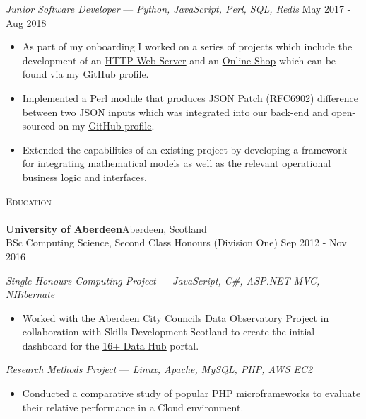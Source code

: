 \documentclass[a4paper]{article}
\newcommand{\lineunder} {
    \vspace*{-8pt} \\
    \hspace*{-18pt} \hrulefill \\
}
\newcommand{\header} [1] {
    {\hspace*{-18pt}\vspace*{6pt} \textsc{#1}}
    \vspace*{-6pt} \lineunder
}
\begin{document}
\textit{Junior Software Developer} — {\sl Python, JavaScript, Perl, SQL, Redis} \hfill May 2017 - Aug 2018\\
\vspace{-1mm}
\begin{itemize} \itemsep 1pt
    \item As part of my onboarding I worked on a series of projects which include the development of an \href{https://github.com/velislavgerov/exercise02}{\underline{HTTP Web Server}} and an \href{https://github.com/velislavgerov/exercise03}{\underline{Online Shop}} which can be found via my \href{https://github.com/velislavgerov}{\underline{GitHub profile}}.
    \item Implemented a \href{https://github.com/velislavgerov/telebid-hackschool/tree/master/perl-json-diff}{\underline{Perl module}} that produces JSON Patch (RFC6902) difference between two JSON inputs which was integrated into our back-end and open-sourced on my \href{https://github.com/velislavgerov}{\underline{GitHub profile}}.
    \item Extended the capabilities of an existing project by developing a framework for integrating mathematical models as well as the relevant operational business logic and interfaces.
\end{itemize}

\header{Education}
\textbf{University of Aberdeen}\hfill Aberdeen, Scotland\\
BSc Computing Science, Second Class Honours (Division One) \hfill Sep 2012 - Nov 2016\\
\vspace*{2mm}

{\textit{Single Honours Computing Project}} — {\sl JavaScript, C\#, ASP.NET MVC, NHibernate}\
\vspace{-1mm}
\begin{itemize} \itemsep 1pt
    \item Worked with the Aberdeen City Council\textquotesingle{}s Data Observatory Project in collaboration with Skills Development Scotland to create the initial dashboard for the \href{https://www.skillsdevelopmentscotland.co.uk/what-we-do/scotlands-careers-services/16plus-data-hub/}{\underline{16+ Data Hub}} portal.\\
\end{itemize}

{\textit{Research Methods Project}} — {\sl Linux, Apache, MySQL, PHP, AWS EC2 }\
\vspace{-1mm}
\begin{itemize} \itemsep 1pt
    \item Conducted a comparative study of popular PHP microframeworks to evaluate their relative performance in a Cloud environment.
\end{itemize}
\end{document}
